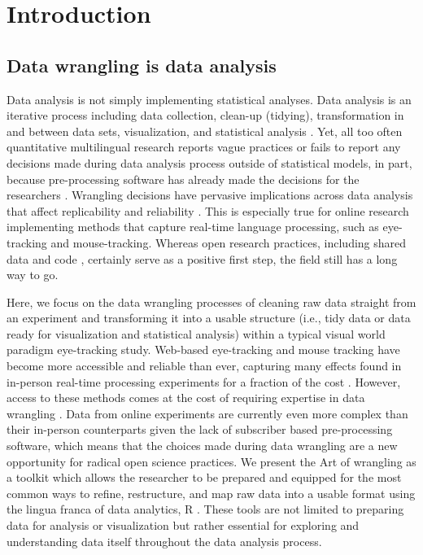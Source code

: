 \section{Introduction}
\subsection{Data wrangling is data analysis}

Data analysis is not simply implementing statistical analyses. Data analysis is an iterative process including data collection, clean-up (tidying), transformation in and between data sets,  visualization, and statistical analysis \parencite{Wickham2017R}. Yet, all too often quantitative multilingual research reports vague practices or fails to report any decisions made during data analysis process outside of statistical models, in part, because pre-processing software has already made the decisions for the researchers \parencite{Prystauka_Altmann_Rothman_2023}. Wrangling decisions have pervasive implications across data analysis that affect replicability and reliability \parencite{ana_flex}. This is especially true for online research implementing methods that capture real-time language processing, such as eye-tracking and mouse-tracking. Whereas open research practices, including shared data and code \parencite{Bolibaugh}, certainly serve as a positive first step, the field still has a long way to go. 

Here, we focus on the data wrangling processes of cleaning raw data straight from an experiment and transforming it into a usable structure (i.e., tidy data or data ready for visualization and statistical analysis) within a typical visual world paradigm eye-tracking study.  Web-based eye-tracking and mouse tracking have become more accessible and reliable than ever, capturing many effects found in in-person real-time processing experiments for a fraction of the cost \parencite[e.g.,][]{Vos_2017,Semmelmann_2017,Prystauka_Altmann_Rothman_2023,Degen_Seeing_2021}. However, access to these methods comes at the cost of requiring expertise in data wrangling \parencite[e.g., ][]{Vos_2017,Prystauka_Altmann_Rothman_2023}. Data from online experiments are currently even more complex than their in-person counterparts given the lack of subscriber based pre-processing software, which means that the choices made during data wrangling are a new opportunity for radical open science practices. We present the Art of wrangling as a toolkit which allows the researcher to be prepared and equipped for the most common ways to refine, restructure, and map raw data into a usable format using the lingua franca of data analytics, R \parencite{mizumoto_r_2015}. These tools are not limited to preparing data for analysis or visualization but rather essential for exploring and understanding data itself throughout the data analysis process. 


